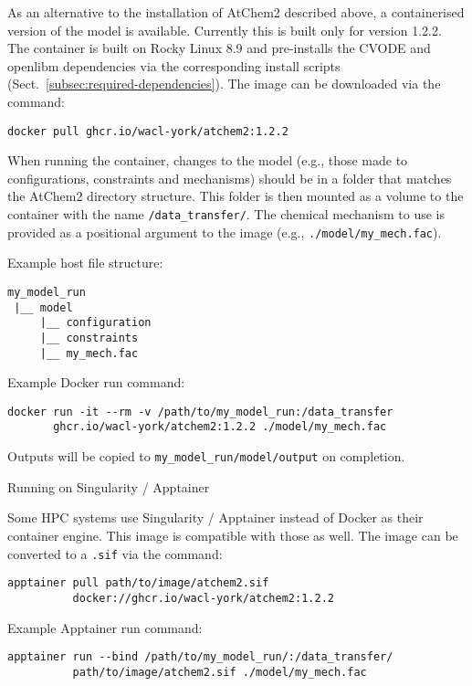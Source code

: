 As an alternative to the installation of AtChem2 described above, a
containerised version of the model is available. Currently this is
built only for version 1.2.2. The container is built on Rocky Linux 8.9
and pre-installs the CVODE and openlibm dependencies via the corresponding
install scripts (Sect.~\ref{subsec:required-dependencies}).
The image can be downloaded via the command:

\begin{verbatim}
docker pull ghcr.io/wacl-york/atchem2:1.2.2
\end{verbatim}

When running the container, changes to the model (e.g., those made to
configurations, constraints and mechanisms) should be in a folder that
matches the AtChem2 directory structure. This folder is then mounted
as a volume to the container with the name \texttt{/data\_transfer/}.
The chemical mechanism to use is provided as a positional argument to
the image (e.g., \texttt{./model/my\_mech.fac}).

Example host file structure:
\begin{verbatim}
my_model_run
 |__ model
     |__ configuration
     |__ constraints
     |__ my_mech.fac
\end{verbatim}

Example Docker run command:

\begin{verbatim}
docker run -it --rm -v /path/to/my_model_run:/data_transfer
       ghcr.io/wacl-york/atchem2:1.2.2 ./model/my_mech.fac
\end{verbatim}

Outputs will be copied to \texttt{my\_model\_run/model/output} on completion.

Running on Singularity / Apptainer

Some HPC systems use Singularity / Apptainer instead of Docker as
their container engine. This image is compatible with those
as well. The image can be converted to a \texttt{.sif} via the command:

\begin{verbatim}
apptainer pull path/to/image/atchem2.sif
          docker://ghcr.io/wacl-york/atchem2:1.2.2
\end{verbatim}

Example Apptainer run command:

\begin{verbatim}
apptainer run --bind /path/to/my_model_run/:/data_transfer/
          path/to/image/atchem2.sif ./model/my_mech.fac
\end{verbatim}


